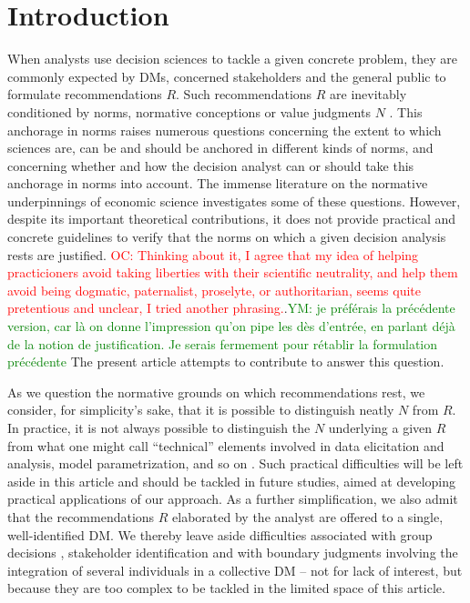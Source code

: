 \documentclass[preprint, french, english, 11pt, authoryear]{elsarticle}%
\newcommand{\commentYM}[1]{\textcolor{green}{YM: #1}}
\newcommand{\commentOC}[1]{\textcolor{red}{OC: #1}}
\begin{document}
\section{Introduction}
When analysts use decision sciences to tackle a given concrete problem, they are commonly expected by \acp{DM}, concerned stakeholders and the general public to formulate recommendations $R$. 
Such recommendations $R$ are inevitably conditioned by norms, normative conceptions or value judgments $N$ \citep{funtowicz_science_1993,brans_ethics_2002,mingers_ethics_2011,ormerod_operational_2013,diekmann_moral_2013}. This anchorage in norms raises numerous questions concerning the extent to which sciences are, can be and should be anchored in different kinds of norms, and concerning whether and how the decision analyst can or should take this anchorage in norms into account. The immense literature on the normative underpinnings of economic science \citep{buchanan_positive_1959, sen_nature_1967, dwyer_scientific_1985, heath_value_1994, sen_rationality_2004, mongin_value_2006, sen_idea_2009, baujard_value_2013} investigates some of these questions. %
However, despite its important theoretical contributions, it does not provide practical and concrete guidelines to verify that the norms on which a given decision analysis rests are justified. \commentOC{Thinking about it, I agree that my idea of helping practicioners avoid taking liberties with their scientific neutrality, and help them avoid being dogmatic, paternalist, proselyte, or authoritarian, seems quite pretentious and unclear, I tried another phrasing.}.\commentYM{je préférais la précédente version, car là on donne l'impression qu'on pipe les dès d'entrée, en parlant déjà de la notion de justification. Je serais fermement pour rétablir la formulation précédente}
The present article attempts to contribute to answer this question. 

As we question the normative grounds on which recommendations rest, we consider, for simplicity's sake, that it is possible to distinguish neatly $N$ from $R$. In practice, it is not always possible to distinguish the $N$ underlying a given $R$ from what one might call ``technical'' elements involved in data elicitation and analysis, model parametrization, and so on \citep{baujard_value_2013}. Such practical difficulties will be left aside in this article and should be tackled in future studies, aimed at developing practical applications of our approach. As a further simplification, we also admit that the recommendations $R$ elaborated by the analyst are offered to a single, well-identified \ac{DM}. We thereby leave aside difficulties associated with group decisions \citep{jackson_towards_1984}, stakeholder identification \citep{wang_systemic_2015} and with boundary judgments involving the integration of several individuals in a collective \ac{DM} \citep{midgley_systemic_2000} -- not for lack of interest, but because they are too complex to be tackled in the limited space of this article.
\end{document}
